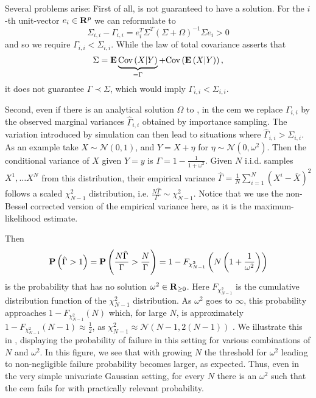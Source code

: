 Several problems arise: First of all,  is not guaranteed to have a solution. For the $i$-th unit-vector $e_{i}\in\R^{p}$ we can reformulate  to 
$$
\Sigma_{i,i} - \Gamma_{i,i} = e_{i}^T\Sigma^{T} \left( \Sigma + \Omega \right)^{-1}\Sigma e_{i} > 0
$$
and so we require $\Gamma_{i,i} < \Sigma_{i,i}$. While the law of total covariance asserts that
$$
\Sigma = \E \underbrace{\cov \left( X | Y \right)}_{=\Gamma} + \cov \left( \E \left( X | Y \right) \right),
$$
it does not guarantee $\Gamma \prec \Sigma$, which would imply $\Gamma_{i,i} < \Sigma_{i,i}$. 

Second, even if there is an analytical solution $\Omega$ to , in the \gls{cem} we replace $\Gamma_{i,i}$ by the observed marginal variances $\hat\Gamma_{i,i}$ obtained by importance sampling. The variation introduced by simulation can then lead to situations where $\hat\Gamma_{i,i} > \Sigma_{i,i}$. As an example take $X \sim \mathcal N(0, 1)$, and $Y = X + \eta$ for $\eta \sim \mathcal N(0, \omega^{2})$. Then the conditional variance of $X$ given $Y = y$ is $\Gamma = 1 - \frac{1}{1 + \omega^{2}}$. Given $N$ i.i.d. samples $X^{1}, \dots X^{N}$ from this distribution, their empirical variance $\hat \Gamma = \frac{1}{N} \sum_{i = 1}^{N} (X^{i} - \bar X)^{2} $ follows a scaled $\chi_{N - 1}^{2}$ distribution, i.e. $ \frac{N\hat\Gamma}{\Gamma} \sim \chi^{2}_{N - 1}$. Notice that we use the non-Bessel corrected version of the empirical variance here, as it is the maximum-likelihood estimate. 

Then $$\P \left( \hat \Gamma > 1 \right) = \P \left( \frac{N \hat \Gamma}{\Gamma} > \frac{N}{\Gamma} \right) = 1 - F_{\chi^{2}_{N-1}} \left( N \left( 1 + \frac{1}{\omega^{2}} \right) \right)$$ is the probability that  has no solution $\omega^{2} \in \R_{\geq 0}$. Here $F_{\chi^{2}_{N - 1}}$ is the cumulative distribution function of the $\chi^{2}_{N - 1}$ distribution. As $\omega^{2}$ goes to $\infty$, this probability approaches $1 - F_{\chi^{2}_{N - 1}}(N)$ which, for large $N$, is approximately $1 - F_{\chi^{2}_{N - 1}} (N - 1) \approx \frac{1}{2}$, as $\chi^{2}_{N-1} \approx \mathcal N\left(N - 1, 2 (N-1)\right)$ \cite[Section 18.5]{Johnson1994Continuous}.
We illustrate this in , displaying the probability of failure in this setting for various combinations of $N$ and $\omega^{2}$. In this figure, we see that with growing $N$ the threshold for $\omega^{2}$ leading to non-negligible failure probability becomes larger, as expected. 
Thus, even in the very simple univariate Gaussian setting, for every $N$ there is an $\omega^{2}$ such that the \gls{cem} fails for  with practically relevant probability. 

